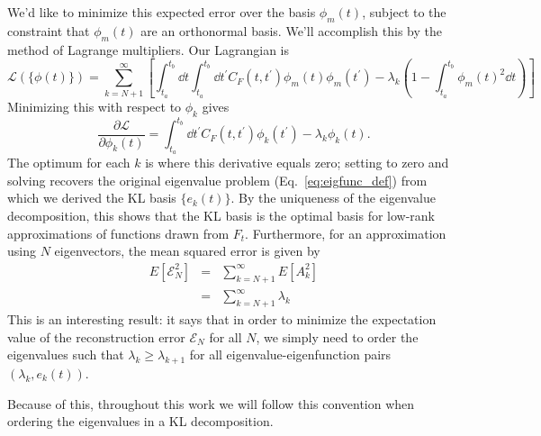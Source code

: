 We'd like to minimize this expected error over the basis $\phi_m(t)$, subject
to the constraint that $\phi_m(t)$ are an orthonormal basis.  We'll accomplish
this by the method of Lagrange multipliers.  Our Lagrangian is
\begin{equation}
  \mathcal{L}(\{\phi(t)\}) = \sum_{k=N+1}^\infty
  \left[\int_{t_a}^{t_b} \dd t \int_{t_a}^{t_b} \dd t^\prime
  C_F(t, t^\prime) \phi_m(t)\phi_m(t^\prime)
  - \lambda_k\left(1 - \int_{t_a}^{t_b} \phi_m(t)^2 \dd t\right)
  \right]
\end{equation}
Minimizing this with respect to $\phi_k$ gives
\begin{equation}
  \frac{\partial\mathcal{L}}{\partial\phi_k(t)} = \int_{t_a}^{t_b} \dd t^\prime
  C_F(t, t^\prime) \phi_k(t^\prime)
  - \lambda_k \phi_k(t).
\end{equation}
The optimum for each $k$ is where this derivative equals zero; setting to
zero and solving recovers the original eigenvalue problem
 (Eq.~\ref{eq:eigfunc_def}) from which we
derived the KL basis $\{e_k(t)\}$.  By the uniqueness of the eigenvalue
decomposition, this shows that the KL basis is the optimal basis for low-rank
approximations of functions drawn from $F_t$.  Furthermore, for an
approximation using $N$ eigenvectors, the mean squared error is given by
\begin{eqnarray}
  E[\mathcal{E}^2_N] &=& \sum_{k=N+1}^\infty E[A_k^2]\nonumber\\
  &=& \sum_{k=N+1}^\infty \lambda_k
\end{eqnarray}
This is an interesting result: it says that in order to minimize the
expectation value of the reconstruction error $\mathcal{E}_N$ for all $N$,
we simply need to order the eigenvalues such that $\lambda_k \ge \lambda_{k+1}$
for all eigenvalue-eigenfunction pairs $(\lambda_k, e_k(t))$.

Because of this, throughout this work we will follow this convention when
ordering the eigenvalues in a KL decomposition.

